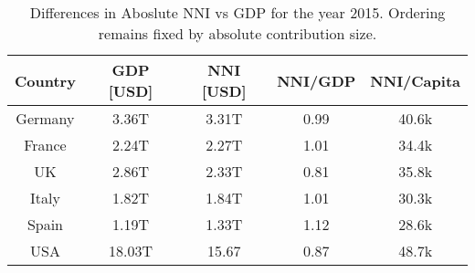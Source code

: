 \begin{center}
\begin{table}[]
\begin{center}
\caption{Differences in Aboslute NNI vs GDP for the year 2015. Ordering remains fixed by absolute 
contribution size.}
\begin{tabular}{ccccc}
\textbf{Country} & \textbf{GDP [USD]} & \textbf{NNI [USD]} &  \textbf{NNI/GDP} & \textbf{NNI/Capita}    \\
\hline
Germany & 3.36T & 3.31T & 0.99 & 40.6k\\
France  & 2.24T & 2.27T & 1.01 & 34.4k\\
UK      & 2.86T & 2.33T & 0.81 & 35.8k\\
Italy   & 1.82T & 1.84T & 1.01 & 30.3k\\
Spain   & 1.19T & 1.33T & 1.12 & 28.6k\\
\hline
USA     & 18.03T & 15.67 & 0.87 & 48.7k\\
\end{tabular}
\end{center}
\end{table}
\end{center}
